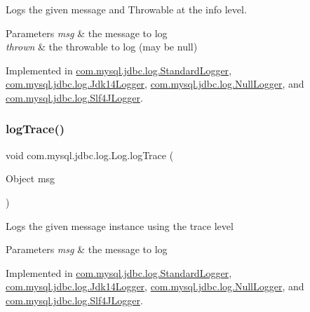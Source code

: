 Logs the given message and Throwable at the \textquotesingle{}info\textquotesingle{} level.


\begin{DoxyParams}{Parameters}
{\em msg} & the message to log \\
\hline
{\em thrown} & the throwable to log (may be null) \\
\hline
\end{DoxyParams}


Implemented in \mbox{\hyperlink{classcom_1_1mysql_1_1jdbc_1_1log_1_1_standard_logger_a4cfdd0fcd7f40b1dcd520c76a0b09235}{com.\+mysql.\+jdbc.\+log.\+Standard\+Logger}}, \mbox{\hyperlink{classcom_1_1mysql_1_1jdbc_1_1log_1_1_jdk14_logger_ac14f891efdd7a92c4b6165555221f008}{com.\+mysql.\+jdbc.\+log.\+Jdk14\+Logger}}, \mbox{\hyperlink{classcom_1_1mysql_1_1jdbc_1_1log_1_1_null_logger_a1b2aee92fb46eff36af64ff88e877f17}{com.\+mysql.\+jdbc.\+log.\+Null\+Logger}}, and \mbox{\hyperlink{classcom_1_1mysql_1_1jdbc_1_1log_1_1_slf4_j_logger_a5dd28a46f364c29f13314a76c075b2d5}{com.\+mysql.\+jdbc.\+log.\+Slf4\+J\+Logger}}.

\mbox{\label{interfacecom_1_1mysql_1_1jdbc_1_1log_1_1_log_a8946382e4cf99819a43cdb3783fd0ee3}} 
\subsubsection{\texorpdfstring{log\+Trace()}{logTrace()}\hspace{0.1cm}{\footnotesize\ttfamily [1/2]}}
{\footnotesize\ttfamily void com.\+mysql.\+jdbc.\+log.\+Log.\+log\+Trace (\begin{DoxyParamCaption}\item[{Object}]{msg }\end{DoxyParamCaption})}

Logs the given message instance using the \textquotesingle{}trace\textquotesingle{} level


\begin{DoxyParams}{Parameters}
{\em msg} & the message to log \\
\hline
\end{DoxyParams}


Implemented in \mbox{\hyperlink{classcom_1_1mysql_1_1jdbc_1_1log_1_1_standard_logger_af35b306462374638f8dc0fb03ae66965}{com.\+mysql.\+jdbc.\+log.\+Standard\+Logger}}, \mbox{\hyperlink{classcom_1_1mysql_1_1jdbc_1_1log_1_1_jdk14_logger_aca41ec6e1a9048dff00daed4ad32050b}{com.\+mysql.\+jdbc.\+log.\+Jdk14\+Logger}}, \mbox{\hyperlink{classcom_1_1mysql_1_1jdbc_1_1log_1_1_null_logger_ad02d3a7495ef1e52a7d558fdabb5d76b}{com.\+mysql.\+jdbc.\+log.\+Null\+Logger}}, and \mbox{\hyperlink{classcom_1_1mysql_1_1jdbc_1_1log_1_1_slf4_j_logger_ae3f7e3b7c4ec00f13fa13e67ce26f471}{com.\+mysql.\+jdbc.\+log.\+Slf4\+J\+Logger}}.

